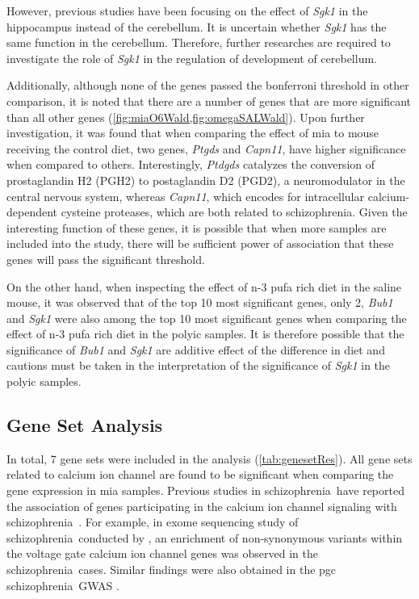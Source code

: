 \documentclass[12pt]{scrbook}
\newcommand*{\scz}{schizophrenia}
\begin{document}
However, previous studies have been focusing on the effect of \textit{Sgk1} in the hippocampus instead of the cerebellum. 
It is uncertain whether \textit{Sgk1} has the same function in the cerebellum.
Therefore, further researches are required to investigate the role of \textit{Sgk1} in the regulation of development of cerebellum.

Additionally, although none of the genes passed the bonferroni threshold in other comparison, it is noted that there are a number of genes that are more significant than all other genes (\cref{fig:miaO6Wald,fig:omegaSALWald}).
Upon further investigation, it was found that when comparing the effect of \gls{mia} to mouse receiving the control diet, two genes, \textit{Ptgds} and \textit{Capn11}, have higher significance when compared to others.
Interestingly, \textit{Ptdgds} catalyzes the conversion of prostaglandin H2 (PGH2) to postaglandin D2 (PGD2), a neuromodulator in the central nervous system, whereas \textit{Capn11}, which encodes for intracellular calcium-dependent cysteine proteases, which are both related to \scz. 
Given the interesting function of these genes, it is possible that when more samples are included into the study, there will be sufficient power of association that these genes will pass the significant threshold.

On the other hand, when inspecting the effect of n-3 \gls{pufa} rich diet in the saline mouse, it was observed that of the top 10 most significant genes, only 2, \textit{Bub1} and \textit{Sgk1} were also among the top 10 most significant genes when comparing the effect of n-3 \gls{pufa} rich diet in the \gls{polyic} samples. 
It is therefore possible that the significance of \textit{Bub1} and \textit{Sgk1} are additive effect of the difference in diet and cautions must be taken in the interpretation of the significance of \textit{Sgk1} in the \gls{polyic} samples.

\subsection{Gene Set Analysis}
In total, 7 gene sets were included in the analysis (\cref{tab:genesetRes}). 
All gene sets related to calcium ion channel are found to be significant when comparing the gene expression in \gls{mia} samples. 
Previous studies in \scz\ have reported the association of genes participating in the calcium ion channel signaling with \scz\ \citep{Lidow2003,purcell2014polygenic,Ripke2014}.
For example, in exome sequencing study of \scz\ conducted by \citet{purcell2014polygenic}, an enrichment of non-synonymous variants within the voltage gate calcium ion channel genes was observed in the \scz\ cases.
Similar findings were also obtained in the \gls{pgc} \scz\ \gls{GWAS} \citep{Ripke2014}.
\end{document}
